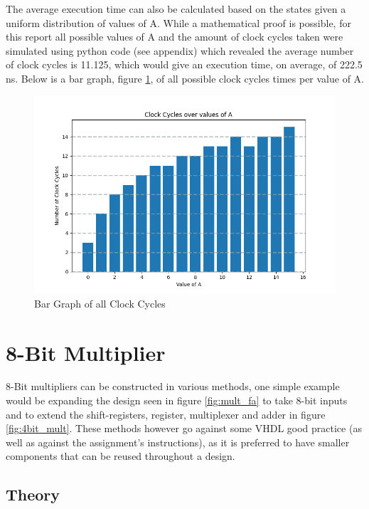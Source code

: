 \documentclass[11pt]{article}
\begin{document}
The average execution time can also be calculated based on the states given a uniform distribution of values of A. 
While a mathematical proof is possible, for this report all possible values of A and the amount of clock cycles taken were simulated using python code (see appendix)
which revealed the average number of clock cycles is 11.125, which would give an execution time, on average, of 222.5 ns.
Below is a bar graph, figure \ref{fig:bar}, of all possible clock cycles times per value of A.

\begin{figure}[H]        
    \centering
    \includegraphics[width=\textwidth]{ClockCycles.png}
    \caption{Bar Graph of all Clock Cycles}
    \label{fig:bar}
\end{figure} 

\section{8-Bit Multiplier}

8-Bit multipliers can be constructed in various methods, one simple example would be expanding the design seen in figure \ref{fig:mult_fa} to take 8-bit inputs and to extend the shift-registers, register, multiplexer and adder in figure \ref{fig:4bit_mult}.
These methods however go against some VHDL good practice (as well as against the assignment's instructions),
as it is preferred to have smaller components that can be reused throughout a design.

\subsection{Theory}
\end{document}
